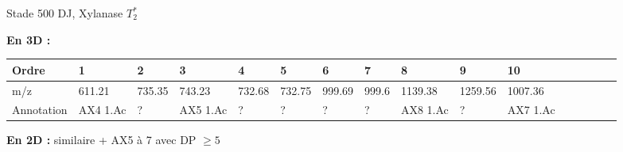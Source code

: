 \documentclass[10pt]{beamer}
\begin{document}
\begin{frame}{Stade 500 DJ, Xylanase}
  $T_2^*$
  
  \textbf{En 3D :}
  \vspace{-0.4cm}
    \begin{table}[]
    \centering
    \begin{adjustbox}{max width=1\textwidth}
      \begin{tabular}{llllllllllllllll}
        \toprule
        Ordre & 1       & 2       & 3       & 4       & 5       & 6       & 7       & 8       & 9       & 10       \\
        \midrule
        m/z &   611.21 & 735.35 & 743.23 & 732.68 & 732.75 & 999.69 & 999.6 & 1139.38 & 1259.56 & 1007.36 \\
        Annotation &  AX4 1.Ac & ? & AX5 1.Ac & ? & ? & ? & ? & AX8 1.Ac & ? & AX7 1.Ac\\
        \bottomrule
      \end{tabular}
    \end{adjustbox}
  \end{table}




  \textbf{En 2D :} similaire + AX5 à 7 avec DP $\geq 5$


\end{frame}
\end{document}
